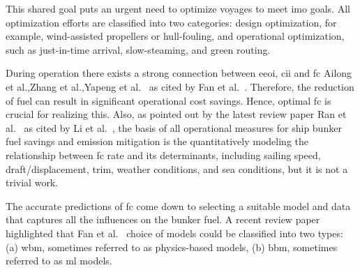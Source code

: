 This shared goal puts an urgent need to optimize voyages to meet \ac{imo} goals. All optimization efforts are classified into two categories: design optimization, for example, wind-assisted propellers or hull-fouling, and operational optimization, such as just-in-time arrival, slow-steaming, and green routing.

During operation there exists a strong connection between \ac{eeoi}, \ac{cii} and \ac{fc} Ailong et al.,Zhang et al.,Yapeng et al.~\citep{FAN2021120266, zhang2017multi, HE2021109733} as cited by Fan et al.~\citep{fanReviewShipFuel}. Therefore, the reduction of fuel can result in significant operational cost savings. Hence, optimal \ac{fc} is crucial for realizing this. Also, as pointed out by the latest review paper Ran et al.~\citep{YAN2021102489} as cited by Li et al.~\citep{liDataFusionMachine2022}, the basis of all operational measures for ship bunker fuel savings and emission mitigation is the quantitatively modeling the relationship between \ac{fc} rate and its determinants, including sailing speed, draft/displacement, trim, weather conditions, and sea conditions, but it is not a trivial work.

The accurate predictions of \ac{fc} come down to selecting a suitable model and data that captures all the influences on the bunker fuel. A recent review paper highlighted that Fan et al.~\citep{fanReviewShipFuel} choice of models could be classified into two types: (a) \ac{wbm}, sometimes referred to as physics-based models, (b) \ac{bbm}, sometimes referred to as \ac{ml} models.

